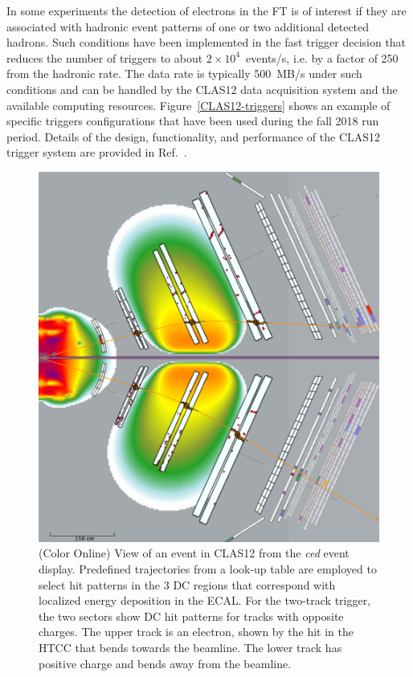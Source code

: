 \documentclass[final,3p,twocolumn]{elsarticle}
\begin{document}
In some experiments the detection of electrons in the FT is of interest if they are associated with hadronic
event patterns of one or two additional detected hadrons. Such conditions have been implemented in the fast trigger
decision that reduces the number of triggers to about $2 \times 10^4$~events/s, i.e. by  a factor of 250 from the
hadronic rate. The data rate is typically 500~MB/s under such conditions and can be handled by the CLAS12 data
acquisition system and the available computing resources. Figure~\ref{CLAS12-triggers} shows an example of specific 
triggers configurations that have been used during the fall 2018 run period. Details of the design, functionality, and performance of
the CLAS12 trigger system are provided in Ref.~\cite{TRIG}. 

\begin{figure}[th!]
\centerline{\includegraphics[width=0.95\columnwidth]{trigger.png}}
\caption{(Color Online) View of an event in CLAS12 from the {\it ced} event display. Predefined trajectories from a look-up
  table are employed to select hit patterns in the 3 DC regions that correspond with localized energy deposition
  in the ECAL. For the two-track trigger, the two sectors show DC hit patterns for tracks with opposite charges.
  The upper track is an electron, shown by the hit in the HTCC that bends towards the beamline. The lower track
  has positive charge and bends away from the beamline.}
\label{trigger}
\end{figure}
\end{document}
